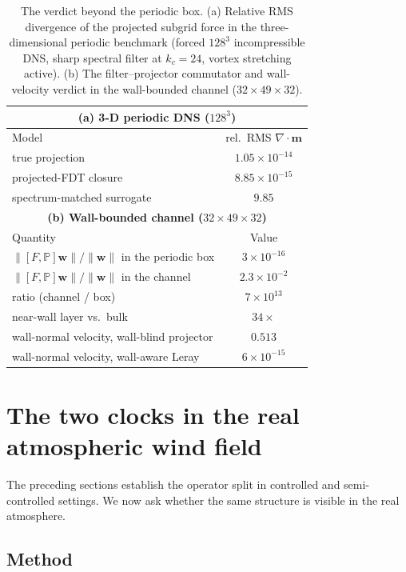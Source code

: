\documentclass[11pt]{article}
\begin{document}
\begin{table}[h]
\centering
\small
\caption{The verdict beyond the periodic box. (a) Relative RMS divergence of the projected subgrid force in the three-dimensional periodic benchmark (forced $128^3$ incompressible DNS, sharp spectral filter at $k_c=24$, vortex stretching active). (b) The filter--projector commutator and wall-velocity verdict in the wall-bounded channel ($32\times49\times32$).}
\label{tab:beyond}
\begin{tabular}{@{}lc@{}}
\toprule
\multicolumn{2}{c}{\textbf{(a) 3-D periodic DNS ($128^3$)}} \\
\midrule
Model & rel.\ RMS $\nabla\!\cdot\!\mathbf{m}$ \\
\midrule
true projection & $1.05\times10^{-14}$ \\
projected-FDT closure & $8.85\times10^{-15}$ \\
spectrum-matched surrogate & $9.85$ \\
\midrule
\multicolumn{2}{c}{\textbf{(b) Wall-bounded channel ($32\times49\times32$)}} \\
\midrule
Quantity & Value \\
\midrule
$\|[F,\mathbb{P}]\mathbf{w}\|/\|\mathbf{w}\|$ in the periodic box & $3\times10^{-16}$ \\
$\|[F,\mathbb{P}]\mathbf{w}\|/\|\mathbf{w}\|$ in the channel & $2.3\times10^{-2}$ \\
ratio (channel / box) & $7\times10^{13}$ \\
near-wall layer vs.\ bulk & $34\times$ \\
wall-normal velocity, wall-blind projector & $0.513$ \\
wall-normal velocity, wall-aware Leray & $6\times10^{-15}$ \\
\bottomrule
\end{tabular}
\end{table}

\section{The two clocks in the real atmospheric wind field}
\label{sec:reanalysis}

The preceding sections establish the operator split in controlled and semi-controlled settings. We now ask whether the same structure is visible in the real atmosphere.

\subsection{Method}
\end{document}
